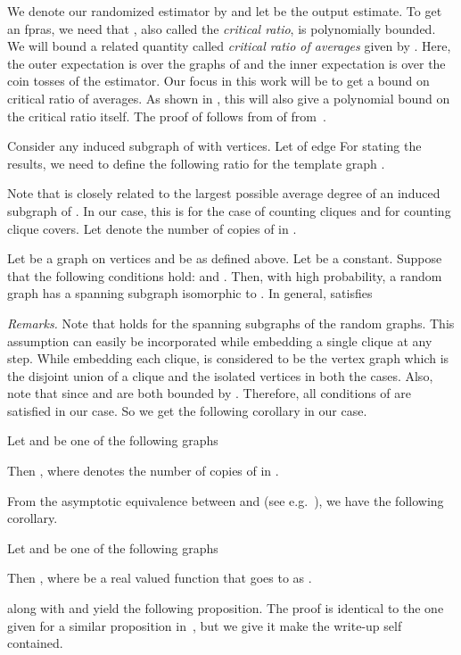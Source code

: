 \documentclass[runningheads,a4paper]{llncs}
\begin{document}
We denote our randomized estimator by  and let  be the output estimate. To get an fpras, we need that , also called the {\em critical ratio}, is polynomially bounded. 
We will bound a related quantity called {\em critical ratio of averages} given by . Here, the outer expectation is over the graphs of   and the inner
 expectation is over the coin tosses of the estimator. Our focus in this work will be to get a bound on critical ratio of averages. As shown in , this will also give a polynomial bound on the critical ratio itself.
The proof of  follows from  of  from~\cite{R00}.

Consider any induced subgraph  of  with  vertices. Let  of edge  For stating the results, we need to define the following ratio for the template graph .


Note that  is closely related to the largest possible average degree of an induced subgraph of . In our case, this is  for the case of counting cliques and  for counting clique covers. Let  
denote the number of copies of  in .

\begin{theorem}[\cite{R00}]\label{thm:app-R00}
Let  be a graph on  vertices and  be as defined above. Let  be a constant. Suppose that the following conditions hold:  and . Then, with high probability, 
a random graph  has a spanning subgraph isomorphic to . In general,
 satisfies 

\end{theorem}
\emph{Remarks.} Note that  holds for the spanning subgraphs of the random graphs. This assumption can easily be incorporated while embedding a single clique at any step. While embedding each clique, 
 is considered to be the  vertex graph which is the disjoint union of a clique and the isolated vertices in both the cases. 
Also, note that  since  and  are both bounded by . Therefore, all conditions of  are satisfied in our case. So we get the following corollary in our case.

\begin{corollary}\label{cor:app-R00}
Let  and  be one of the following graphs 

Then , where  denotes the number of copies of  in .
\end{corollary}

From the asymptotic equivalence between  and  (see e.g.~\cite{JLR00,R94}), we have the following corollary.

\begin{corollary}\label{cor:app-asymptotic}
Let  and  be one of the following graphs 

Then , where   be a real valued function that goes to  as .
\end{corollary}
 along with  and  yield the following proposition. The proof is identical to the one given for a similar proposition in~\cite{FK08}, but we give it make the write-up self contained.
\end{document}
